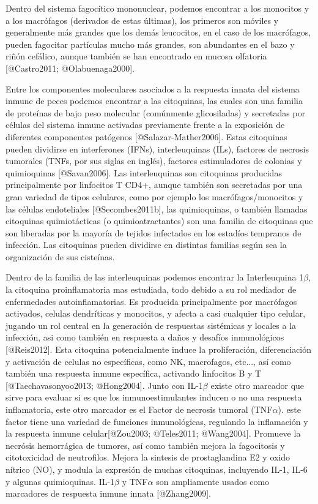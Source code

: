 Dentro del sistema fagocítico mononuclear, podemos encontrar a los monocitos y a los macrófagos (derivados de estas últimas), los primeros son móviles y generalmente más grandes que los demás leucocitos, en el caso de los macrófagos, pueden fagocitar partículas mucho más grandes, son abundantes en el bazo y riñón cefálico, aunque también se han encontrado en mucosa olfatoria [@Castro2011; @Olabuenaga2000].

Entre los componentes moleculares asociados a la respuesta innata del sistema inmune de peces podemos encontrar a las citoquinas, las cuales son una familia de proteínas de bajo peso molecular (comúnmente glicosiladas) y secretadas por células del sistema inmune activadas previamente frente a la exposición de diferentes componentes patógenos [@Salazar-Mather2006]⁠. Estas citoquinas pueden dividirse en interferones (IFNs), interleuquinas (ILs), factores de necrosis tumorales (TNFs, por sus siglas en inglés), factores estimuladores de colonias y quimioquinas [@Savan2006]⁠. Las interleuquinas son citoquinas producidas principalmente por linfocitos T CD4+, aunque también son secretadas por una gran variedad de tipos celulares, como por ejemplo los macrófagos/monocitos y las células endoteliales [@Secombes2011b], las quimioquinas, o también llamadas citoquinas quimiotácticas (o quimioatractantes) son una familia de citoquinas que son liberadas por la mayoría de tejidos infectados en los estadíos tempranos de infección. Las citoquinas pueden dividirse en distintas familias según sea la organización de sus cisteínas. 

Dentro de la familia de las interleuquinas podemos encontrar la Interleuquina 1$\beta$, la citoquina proinflamatoria mas estudiada, todo debido a su rol mediador de enfermedades autoinflamatorias. Es producida principalmente por macrófagos activados, celulas dendríticas y monocitos, y afecta a casi cualquier tipo celular, jugando un rol central en la generación de respuestas sistémicas y locales a la infección, asi como también en respuesta a daños y desafíos inmunológicos [@Reis2012]. Esta citoquina potencialmente induce la proliferación, diferenciación y activación de celulas no específicas, como NK, macrofagos, etc..., así como también una respuesta inmune específica, activando linfocitos B y T  [@Taechavasonyoo2013; @Hong2004]. Junto con IL-1$\beta$ existe otro marcador que sirve para evaluar si es que los inmunoestimulantes inducen o no una respuesta inflamatoria, este otro marcador es el Factor de necrosis tumoral (TNF$\alpha$). este factor tiene una variedad de funciones inmunológicas, regulando la inflamación y la respuesta inmune celular[@Zou2003; @Teles2011; @Wang2004]. Promueve la necrósis hemorrágica de tumores, así como también mejora la fagocitosis y citotoxicidad de neutrofilos. Mejora la sintesis de prostaglandina E2 y oxido nítrico (NO), y modula la expresión de muchas citoquinas, incluyendo IL-1, IL-6 y algunas quimioquinas. IL-1$\beta$ y TNF$\alpha$ son ampliamente usados como marcadores de respuesta inmune innata [@Zhang2009].

